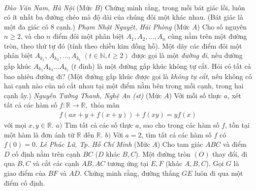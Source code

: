 \begin{multicols}{2}
\begin{align*}
	\end{align*}
	\vskip 0.05cm
		\hfill\textit{Đào Văn Nam, Hà Nội}
	\vskip 0.05cm
	{}
	(Mức $B$) Chứng minh rằng, trong mỗi bát giác lồi, luôn có ít nhất ba đường chéo mà độ dài của chúng đôi một khác nhau. 
	\vskip 0.05cm
	(Bát giác là một đa giác có $8$ cạnh.)
	\vskip 0.1cm
		\hfill \textit{Phạm Nhật Nguyệt, Hải Phòng}
	\vskip 0.1cm
	{}
	(Mức $A$) Cho số nguyên $n \geq 2$, và cho $n$ điểm đôi một phân biệt $A_1, A_2, \ldots, A_n$ cùng nằm trên một đường tròn, theo thứ tự đó (tính theo chiều kim đồng hồ). Một dãy các điểm đôi một phân biệt $A_{k_1}$, $A_{k_2}, \ldots, A_{k_t}$ $(t \in\mathbb N, t \geq 2)$ được gọi là một {\it đường đi}, nếu đường gấp khúc $A_{k_1} A_{k_2} \ldots A_{k_t}$ ($t$ đỉnh) là một đường gấp khúc không tự cắt. Hỏi có tất cả bao nhiêu đường đi?
	\vskip 0.05cm
	(Một đường gấp khúc được gọi là {\it không tự cắt}, nếu không có hai cạnh nào của nó cắt nhau tại một điểm nằm bên trong mỗi cạnh, trong hai cạnh ấy.)
	\vskip 0.1cm
	\hfill	\textit{Nguyễn Tường Thanh, Nghệ An (st)}
	\vskip 0.1cm
	{}
	(Mức $A$) Với mỗi số thực $a$, xét tất cả các hàm số $f: \mathbb R \rightarrow \mathbb R,$ thỏa mãn
	\begin{align*}
		f(a x+y+f(x+y))+f(x y)=y f(x)
	\end{align*}
	với mọi $x,y\in\mathbb R$.
	\vskip 0.05cm
	$a)$ Tìm tất cả các số thực $a$, sao cho trong các hàm số $f$, tồn tại một hàm là đơn ánh từ $\mathbb R$ đến $\mathbb R$.
	\vskip 0.05cm
	$b)$ Với $a=2$, tìm tất cả các hàm số $f$ có $f(0)=0$.
	\vskip 0.1cm
	\hfill		\textit{Lê Phúc Lữ, Tp. Hồ Chí Minh}
	\vskip 0.1cm
	{}
	(Mức $A$) Cho tam giác $ABC$ và điểm $D$ cố định nằm trên cạnh $BC$ ($D$ khác $B,C$). Một đường tròn $(O)$ thay đổi, đi qua $B, C$ và cắt các cạnh $AB, AC$ tương ứng tại $E, F$ (khác $A,B,C$). Gọi $G$ là giao điểm của $BF$ và $AD$. Chứng minh rằng, đường thẳng $GE$ luôn đi qua một điểm cố định.
	\begin{figure}[H]
		\vspace*{-10pt}
		\centering
		\captionsetup{labelformat= empty, justification=centering}
		\begin{tikzpicture}[line cap=round,line join=round,>=triangle 45,x=1cm,y=1cm,scale=0.5]

\end{tikzpicture}
\end{figure}
\end{multicols}
